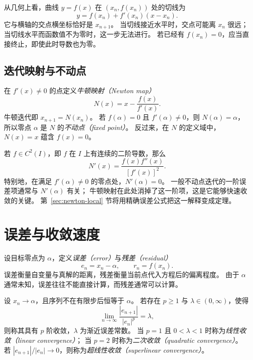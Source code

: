 \documentclass[UTF8,12pt,a4paper,fontset=fandol]{ctexart}
\begin{document}
从几何上看，曲线 $y=f(x)$ 在 $(x_n,f(x_n))$ 处的切线为
\[
  y=f(x_n)+f'(x_n)(x-x_n).
\]
它与横轴的交点横坐标恰好是 $x_{n+1}$。
当切线接近水平时，交点可能离 $x_n$ 很远；当切线水平而函数值不为零时，这一步无法进行。
若已经有 $f(x_n)=0$，应当直接终止，即使此时导数也为零。

\subsection{迭代映射与不动点}

在 $f'(x)\ne0$ 的点定义\emph{牛顿映射（Newton map）}
\begin{equation}\label{eq:newton-map}
  N(x)=x-\frac{f(x)}{f'(x)}.
\end{equation}
牛顿迭代即 $x_{n+1}=N(x_n)$。
若 $f(\alpha)=0$ 且 $f'(\alpha)\ne0$，则 $N(\alpha)=\alpha$，
所以零点 $\alpha$ 是 $N$ 的\emph{不动点（fixed point）}。
反过来，在 $N$ 的定义域中，$N(x)=x$ 蕴含 $f(x)=0$。

若 $f\in C^2(I)$，即 $f$ 在 $I$ 上有连续的二阶导数，那么
\begin{equation}\label{eq:newton-map-derivative}
  N'(x)=\frac{f(x)f''(x)}{[f'(x)]^2}.
\end{equation}
特别地，在满足 $f'(\alpha)\ne0$ 的零点处，$N'(\alpha)=0$。
一般不动点迭代的一阶误差项通常与 $N'(\alpha)$ 有关；
牛顿映射在此处消掉了这一阶项，这是它能够快速收敛的关键。
第~\ref{sec:newton-local} 节将用精确误差公式把这一解释变成定理。

\section{误差与收敛速度}
\label{sec:newton-order}

设目标零点为 $\alpha$，定义\emph{误差（error）}与\emph{残差（residual）}
\[
  e_n=x_n-\alpha,\qquad r_n=f(x_n).
\]
误差衡量自变量与真解的距离，残差衡量当前点代入方程后的偏离程度。
由于 $\alpha$ 通常未知，误差往往不能直接计算，而残差通常可以计算。

\begin{definition}[收敛阶]\label{def:newton-order}
设 $x_n\to\alpha$，且序列不在有限步后恒等于 $\alpha$。
若存在 $p\ge1$ 与 $\lambda\in(0,\infty)$，使得
\[
  \lim_{n\to\infty}\frac{|e_{n+1}|}{|e_n|^p}=\lambda,
\]
则称其具有 $p$ 阶收敛，$\lambda$ 为渐近误差常数。
当 $p=1$ 且 $0<\lambda<1$ 时称为\emph{线性收敛（linear convergence）}；
当 $p=2$ 时称为\emph{二次收敛（quadratic convergence）}。
若 $|e_{n+1}|/|e_n|\to0$，则称为\emph{超线性收敛（superlinear convergence）}。
\end{definition}
\end{document}
